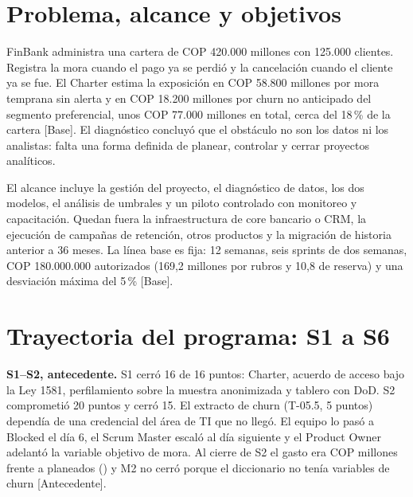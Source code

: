 \documentclass[10pt,a4paper]{article}
\newcommand{\rot}[1]{\textsf{\scriptsize\color{gris}[#1]}}
\begin{document}
\section{Problema, alcance y objetivos}

FinBank administra una cartera de COP 420.000 millones con 125.000 clientes. Registra la mora cuando el pago ya se perdió y la cancelación cuando el cliente ya se fue. El Charter estima la exposición en COP 58.800 millones por mora temprana sin alerta y en COP 18.200 millones por churn no anticipado del segmento preferencial, unos COP 77.000 millones en total, cerca del 18\,\% de la cartera \rot{Base}. El diagnóstico concluyó que el obstáculo no son los datos ni los analistas: falta una forma definida de planear, controlar y cerrar proyectos analíticos.

El alcance incluye la gestión del proyecto, el diagnóstico de datos, los dos modelos, el análisis de umbrales y un piloto controlado con monitoreo y capacitación. Quedan fuera la infraestructura de core bancario o CRM, la ejecución de campañas de retención, otros productos y la migración de historia anterior a 36 meses. La línea base es fija: 12 semanas, seis sprints de dos semanas, COP 180.000.000 autorizados (169,2 millones por rubros y 10,8 de reserva) y una desviación máxima del 5\,\% \rot{Base}.

\begin{table}[h]
\caption{Trazabilidad de los objetivos del Charter al cierre}\label{tab:obj}

\end{table}

\section{Trayectoria del programa: S1 a S6}

\begin{table}[h]
\caption{Cierre de los seis sprints (compromiso y puntos que cumplen la DoD)}\label{tab:sprints}

\end{table}

\textbf{S1--S2, antecedente.} S1 cerró 16 de 16 puntos: Charter, acuerdo de acceso bajo la Ley 1581, perfilamiento sobre la muestra anonimizada y tablero con DoD. S2 comprometió 20 puntos y cerró 15. El extracto de churn (T-05.5, 5 puntos) dependía de una credencial del área de TI que no llegó. El equipo lo pasó a Blocked el día 6, el Scrum Master escaló al día siguiente y el Product Owner adelantó la variable objetivo de mora. Al cierre de S2 el gasto era COP \GastoSdos{} millones frente a \BaseSdos{} planeados (\DesvSdos) y M2 no cerró porque el diccionario no tenía variables de churn \rot{Antecedente}.
\end{document}
